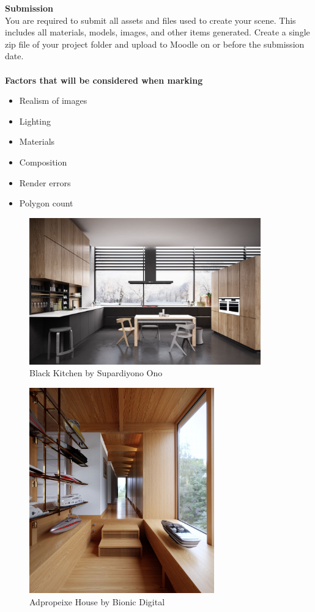 \newpage
\textbf{Submission}\\

You are required to submit all assets and files used to create your scene.  This includes all materials, models, images, and other items generated.  Create a single zip file of your project folder and upload to Moodle on or before the submission date.\\





\\

\textbf{Factors that will be considered when marking}\\
\begin{itemize}
	\item Realism of images
	\item Lighting
	\item Materials
	\item Composition
	\item Render errors
	\item Polygon count
\end{itemize}



\begin{figure}
	\centering
		\includegraphics[width=10cm]{img/blackKitchen.jpg}
	\caption{Black Kitchen by Supardiyono Ono}
	\label{fig:1}
\end{figure}



\begin{figure}
	\centering
		\includegraphics[width=8cm]{img/AH.jpg}
	\caption{Adpropeixe House by Bionic Digital}
	\label{fig:2}
\end{figure}


